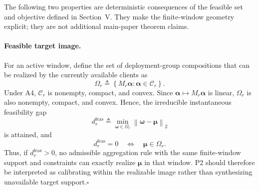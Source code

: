 The following two properties are deterministic consequences of the feasible
set and objective defined in Section~V.  They make the
finite-window geometry explicit; they are not additional main-paper theorem
claims.

\paragraph{Feasible target image.}
For an active window, define the set of deployment-group compositions that can
be realized by the currently available clients as
\begin{equation}
 \Omega_r
 \triangleq
 \left\{
 M_r\boldsymbol\alpha:
 \boldsymbol\alpha\in\mathcal C_r
 \right\}.
 \label{eq:app_feasible_target_image}
\end{equation}
Under A4, $\mathcal C_r$ is nonempty, compact, and convex.  Since
$\boldsymbol\alpha\mapsto M_r\boldsymbol\alpha$ is linear, $\Omega_r$ is also
nonempty, compact, and convex.  Hence, the irreducible instantaneous
feasibility gap
\begin{equation}
 d_r^{\mathrm{feas}}
 \triangleq
 \min_{\boldsymbol\omega\in\Omega_r}
 \left\|
 \boldsymbol\omega-\boldsymbol\mu
 \right\|_2
 \label{eq:app_feasibility_gap}
\end{equation}
is attained, and
\begin{equation}
 d_r^{\mathrm{feas}}=0
 \quad\Longleftrightarrow\quad
 \boldsymbol\mu\in\Omega_r.
 \label{eq:app_exact_realizability}
\end{equation}
Thus, if $d_r^{\mathrm{feas}}>0$, no admissible aggregation rule with the same
finite-window support and constraints can exactly realize
$\boldsymbol\mu$ in that window.  P2 should therefore be interpreted as
calibrating within the realizable image rather than synthesizing unavailable
target support.\hfill$\square$

